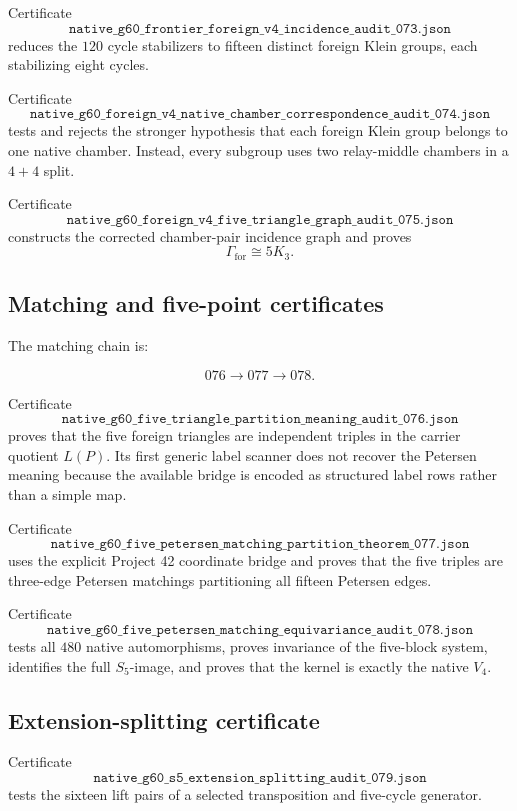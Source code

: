 Certificate
\[
\texttt{native\_g60\_frontier\_foreign\_v4\_incidence\_audit\_073.json}
\]
reduces the \(120\) cycle stabilizers to fifteen distinct foreign Klein
groups, each stabilizing eight cycles.

Certificate
\[
\texttt{native\_g60\_foreign\_v4\_native\_chamber\_correspondence\_audit\_074.json}
\]
tests and rejects the stronger hypothesis that each foreign Klein
group belongs to one native chamber. Instead, every subgroup uses two
relay-middle chambers in a \(4+4\) split.

Certificate
\[
\texttt{native\_g60\_foreign\_v4\_five\_triangle\_graph\_audit\_075.json}
\]
constructs the corrected chamber-pair incidence graph and proves
\[
\Gamma_{\mathrm{for}}\cong5K_3.
\]

\subsection{Matching and five-point certificates}

The matching chain is:

\[
076
\longrightarrow
077
\longrightarrow
078.
\]

Certificate
\[
\texttt{native\_g60\_five\_triangle\_partition\_meaning\_audit\_076.json}
\]
proves that the five foreign triangles are independent triples in the
carrier quotient \(L(P)\). Its first generic label scanner does not
recover the Petersen meaning because the available bridge is encoded
as structured label rows rather than a simple map.

Certificate
\[
\texttt{native\_g60\_five\_petersen\_matching\_partition\_theorem\_077.json}
\]
uses the explicit Project 42 coordinate bridge and proves that the five
triples are three-edge Petersen matchings partitioning all fifteen
Petersen edges.

Certificate
\[
\texttt{native\_g60\_five\_petersen\_matching\_equivariance\_audit\_078.json}
\]
tests all \(480\) native automorphisms, proves invariance of the
five-block system, identifies the full \(S_5\)-image, and proves that
the kernel is exactly the native \(V_4\).

\subsection{Extension-splitting certificate}

Certificate
\[
\texttt{native\_g60\_s5\_extension\_splitting\_audit\_079.json}
\]
tests the sixteen lift pairs of a selected transposition and
five-cycle generator.

